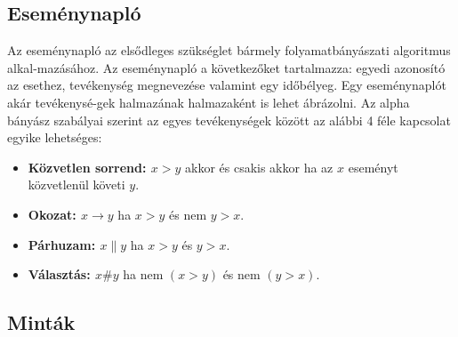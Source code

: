 \subsection{Eseménynapló}
Az eseménynapló az elsődleges szükséglet bármely folyamatbányászati algoritmus alkal\hyp{}mazásához. Az eseménynapló a következőket tartalmazza: egyedi azonosító az esethez, tevékenység megnevezése valamint egy időbélyeg. Egy eseménynaplót akár tevékenysé\hyp{}gek halmazának halmazaként is lehet ábrázolni.
\newpage
Az alpha bányász szabályai szerint az egyes tevékenységek között az alábbi 4 féle kapcsolat egyike lehetséges:
\begin{itemize}
\item \textbf{Közvetlen sorrend: $x > y$} akkor és csakis akkor ha az $x$ eseményt közvetlenül követi $y$.
\item \textbf{Okozat: $x \rightarrow y$} ha $x > y$ és nem $y > x$.
\item \textbf{Párhuzam: $x \parallel y$} ha $x > y$ és $y > x$.
\item \textbf{Választás: $x \# y$} ha nem $(x > y)$ és nem $(y > x)$.
\end{itemize}

\subsection{Minták}

